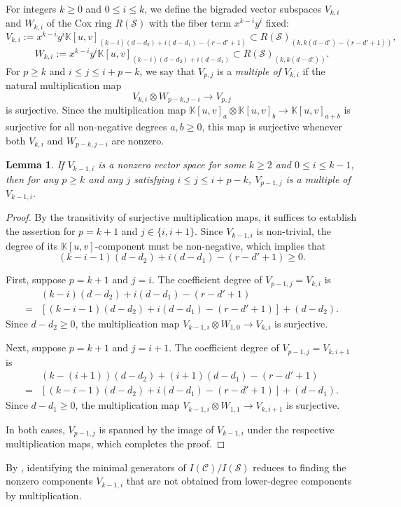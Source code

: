 \documentclass[a4paper, 11pt]{amsart}
\numberwithin{theorem}{section}
\newtheorem{lemma}[theorem]{Lemma}
\theoremstyle{definition}
\numberwithin{equation}{section}
\begin{document}
For integers $k \ge 0$ and $0 \le i \le k$, we define the bigraded vector subspaces $V_{k,i}$ and $W_{k,i}$ of the Cox ring $R(\mathcal{S})$ with the fiber term $x^{k-i}y^i$ fixed:
\[
V_{k,i} := x^{k-i}y^i \mathbb{K}[u,v]_{(k-i)(d-d_2)+i(d-d_1)-(r-d'+1)} \subset R(\mathcal{S})_{(k, k(d-d')-(r-d'+1))},
\]
\[
W_{k,i} := x^{k-i}y^i \mathbb{K}[u,v]_{(k-i)(d-d_2)+i(d-d_1)} \subset R(\mathcal{S})_{(k, k(d-d'))}.
\]
For $p \ge k$ and $i \le j \le i+p-k$, we say that $V_{p,j}$ is a \emph{multiple of $V_{k,i}$} if the natural multiplication map 
\[
V_{k,i} \otimes W_{p-k, j-i} \longrightarrow V_{p,j}
\]
is surjective. 
Since the multiplication map $\mathbb{K}[u,v]_a \otimes \mathbb{K}[u,v]_b \to \mathbb{K}[u,v]_{a+b}$ is surjective for all non-negative degrees $a, b \ge 0$, this map is surjective whenever both $V_{k,i}$ and $W_{p-k, j-i}$ are nonzero.

\begin{lemma}\label{lem:divisibility}
If $V_{k-1,i}$ is a nonzero vector space for some $k \geq 2$ and $0 \leq i \leq k-1$, then for any $p \geq k$ and any $j$ satisfying $i \leq j \leq i+p-k$, $V_{p-1,j}$ is a multiple of $V_{k-1,i}$.
\end{lemma}

\begin{proof}
By the transitivity of surjective multiplication maps, it suffices to establish the assertion for $p = k+1$ and $j \in \{i, i+1\}$. 
Since $V_{k-1,i}$ is non-trivial, the degree of its $\mathbb{K}[u,v]$-component must be non-negative, which implies that 
\[
(k-i-1)(d-d_2)+i(d-d_1)-(r-d'+1) \geq 0.
\]

First, suppose $p = k+1$ and $j = i$.
The coefficient degree of $V_{p-1,j}=V_{k,i}$ is
\begin{align*}
 & (k-i)(d-d_2)+i(d-d_1)-(r-d'+1) \\
= & \left[ (k-i-1)(d-d_2)+i(d-d_1)-(r-d'+1) \right] + (d-d_2).
\end{align*}
Since $d-d_2 \geq 0$, the multiplication map $V_{k-1,i} \otimes W_{1,0} \to V_{k,i}$ is surjective.

Next, suppose $p = k+1$ and $j = i+1$. 
The coefficient degree of $V_{p-1,j}=V_{k,i+1}$ is
\begin{align*}
 & (k-(i+1))(d-d_2)+(i+1)(d-d_1)-(r-d'+1) \\
= & \left[ (k-i-1)(d-d_2)+i(d-d_1)-(r-d'+1) \right] + (d-d_1).
\end{align*}
Since $d-d_1 \geq 0$, the multiplication map $V_{k-1,i} \otimes W_{1,1} \to V_{k,i+1}$ is surjective.

In both cases, $V_{p-1,j}$ is spanned by the image of $V_{k-1,i}$ under the respective multiplication maps, which completes the proof.
\end{proof}
By , identifying the minimal generators of $I(\mathcal C)/I(\mathcal S)$ reduces to finding the nonzero components $V_{k-1,i}$ that are not obtained from lower-degree components by multiplication.
\end{document}
